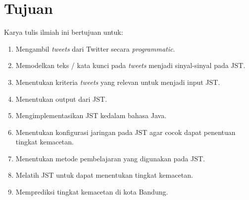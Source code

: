 \section{Tujuan}
Karya tulis ilmiah ini bertujuan untuk:
\begin{enumerate}
	\item Mengambil \textit{tweets} dari Twitter secara \textit{programmatic}.
	\item Memodelkan teks / kata kunci pada \textit{tweets} menjadi sinyal-sinyal pada JST.
	\item Menentukan kriteria \textit{tweets} yang relevan untuk menjadi input JST.
	\item Menentukan output dari JST.
	\item Mengimplementasikan JST kedalam bahasa Java.
	\item Menentukan konfigurasi jaringan pada JST agar cocok dapat penentuan tingkat kemacetan.
	\item Menentukan metode pembelajaran yang digunakan pada JST.
	\item Melatih JST untuk dapat menentukan tingkat kemacetan.
	\item Memprediksi tingkat kemacetan di kota Bandung.
\end{enumerate}